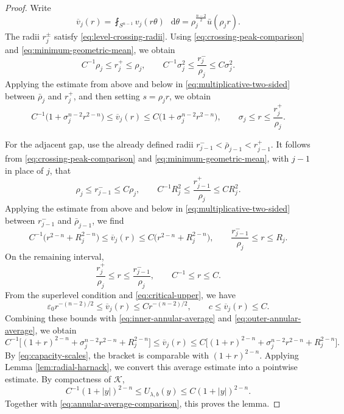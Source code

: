 \documentclass[11pt]{article}
\numberwithin{equation}{section}
\theoremstyle{remark}
\newcommand{\Sph}{S}
\newcommand{\eps}{\varepsilon}
\newcommand{\dd}{\mathop{}\!\mathrm{d}}
\begin{document}
\par
\begin{proof}
Write
\[
 \overline v_j(r)=\fint_{\Sph^{n-1}}v_j(r\theta)\,\dd\theta
 =\rho_j^{\frac{n-2}{2}}\bar u(\rho_jr).
\]
The radii \(r_j^\pm\) satisfy
\eqref{eq:level-crossing-radii}.
{Using \eqref{eq:crossing-peak-comparison} and
\eqref{eq:minimum-geometric-mean}, we obtain}
\[
 C^{-1}\rho_j\le r_j^+\le\rho_j,
 \qquad
 C^{-1}\sigma_j^2\le\frac{r_j^-}{\rho_j}\le C\sigma_j^2.
\]
{Applying the estimate from above and below in
\eqref{eq:multiplicative-two-sided} between
\(\bar\rho_j\) and \(r_j^+\), and then setting \(s=\rho_jr\), we obtain}
\begin{equation}\label{eq:inner-annular-average}
 C^{-1}\bigl(1+\sigma_j^{n-2}r^{2-n}\bigr)
 \le\overline v_j(r)\le
 C\bigl(1+\sigma_j^{n-2}r^{2-n}\bigr),
 \qquad \sigma_j\le r\le\frac{r_j^+}{\rho_j}.
\end{equation}

For the adjacent gap, use the already defined radii
\(r_{j-1}^-<\bar\rho_{j-1}<r_{j-1}^+\).
{It follows from \eqref{eq:crossing-peak-comparison} and
\eqref{eq:minimum-geometric-mean}, with \(j-1\) in place of \(j\), that}
\[
 \rho_j\le r_{j-1}^-\le C\rho_j,
 \qquad
 C^{-1}R_j^2\le\frac{r_{j-1}^+}{\rho_j}\le CR_j^2.
\]
{Applying the estimate from above and below in
\eqref{eq:multiplicative-two-sided} between
\(r_{j-1}^-\) and \(\bar\rho_{j-1}\), we find}
\begin{equation}\label{eq:outer-annular-average}
 C^{-1}\bigl(r^{2-n}+R_j^{2-n}\bigr)
 \le\overline v_j(r)\le
 C\bigl(r^{2-n}+R_j^{2-n}\bigr),
 \qquad \frac{r_{j-1}^-}{\rho_j}\le r\le R_j.
\end{equation}
On the remaining interval,
\[
 \frac{r_j^+}{\rho_j}\le r\le\frac{r_{j-1}^-}{\rho_j},
 \qquad C^{-1}\le r\le C.
\]
{From the superlevel condition and
\eqref{eq:critical-upper}, we have}
\[
 \eps_0r^{-(n-2)/2}\le\overline v_j(r)
 \le Cr^{-(n-2)/2},\qquad c\le\overline v_j(r)\le C.
\]
{Combining these bounds with
\eqref{eq:inner-annular-average} and
\eqref{eq:outer-annular-average}, we obtain}
 {
\begin{equation}\label{eq:annular-average-comparison}
 C^{-1}\bigl[(1+r)^{2-n}
 +\sigma_j^{n-2}r^{2-n}+R_j^{2-n}\bigr]
 \le\overline v_j(r)
 \le C\bigl[(1+r)^{2-n}
 +\sigma_j^{n-2}r^{2-n}+R_j^{2-n}\bigr].
\end{equation}
}
By \eqref{eq:capacity-scales}, the bracket is comparable with
\((1+r)^{2-n}\).
{Applying Lemma  \ref{lem:radial-harnack}, we convert this
average estimate into a pointwise estimate.  By compactness of
\(\mathcal K\),}
\[
 C^{-1}(1+|y|)^{2-n}
 \le U_{\lambda,b}(y)
 \le C(1+|y|)^{2-n}.
\]
Together with \eqref{eq:annular-average-comparison}, this proves the lemma.
\end{proof}
\end{document}
